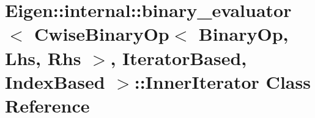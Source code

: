 \hypertarget{class_eigen_1_1internal_1_1binary__evaluator_3_01_cwise_binary_op_3_01_binary_op_00_01_lhs_00_012b4683c8809d5a8c88ca2030de640ed2}{}\section{Eigen\+:\+:internal\+:\+:binary\+\_\+evaluator$<$ Cwise\+Binary\+Op$<$ Binary\+Op, Lhs, Rhs $>$, Iterator\+Based, Index\+Based $>$\+:\+:Inner\+Iterator Class Reference}
\label{class_eigen_1_1internal_1_1binary__evaluator_3_01_cwise_binary_op_3_01_binary_op_00_01_lhs_00_012b4683c8809d5a8c88ca2030de640ed2}
